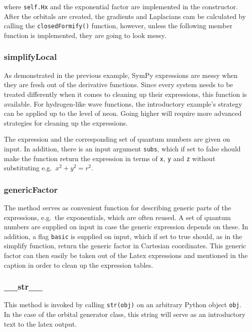 where \verb+self.Hx+ and the exponential factor are implemented in the constructor. After the orbitals are created, the gradients and Laplacians cam be calculated by calling the \verb+closedFormify()+ function, however, unless the following member function is implemented, they are going to look messy.

\subsubsection{simplifyLocal}

As demonstrated in the previous example, SymPy expressions are messy when they are fresh out of the derivative functions. Since every system needs to be treated differently when it comes to cleaning up their expressions, this function is available. For hydrogen-like wave functions, the introductory example's strategy can be applied up to the level of neon. Going higher will require more advanced strategies for cleaning up the expressions.

The expression and the corresponding set of quantum numbers are given on input. In addition, there is an input argument \verb+subs+, which if set to false should make the function return the expression in terms of \verb+x+, \verb+y+ and \verb+z+ without substituting e.g.~$x^2 + y^2 = r^2$.

\subsubsection{genericFactor}

The method serves as convenient function for describing generic parts of the expressions, e.g.~the exponentials, which are often reused. A set of quantum numbers are supplied on input in case the generic expression depends on these. In addition, a flag \verb+basic+ is supplied on input, which if set to true should, as in the simplify function, return the generic factor in Cartesian coordinates. This generic factor can then easily be taken out of the Latex expressions and mentioned in the caption in order to clean up the expression tables.

\subsubsection{\_\_str\_\_}

This method is invoked by calling \verb+str(obj)+ on an arbitrary Python object \verb+obj+. In the case of the orbital generator class, this string will serve as an introductory text to the latex output.

